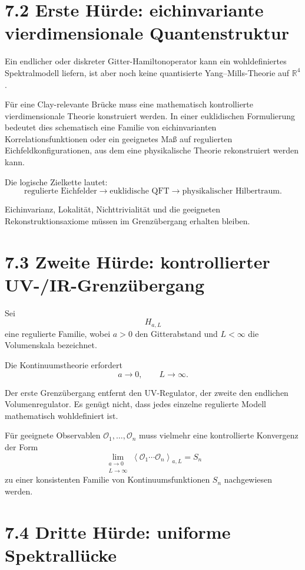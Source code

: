 \documentclass[11pt,a4paper]{article}
\begin{document}
\section*{7.2 Erste Hürde: eichinvariante vierdimensionale Quantenstruktur}

Ein endlicher oder diskreter Gitter-Hamiltonoperator kann ein wohldefiniertes
Spektralmodell liefern, ist aber noch keine quantisierte Yang--Mills-Theorie auf
$\mathbb R^4$.

Für eine Clay-relevante Brücke muss eine mathematisch kontrollierte
vierdimensionale Theorie konstruiert werden. In einer euklidischen Formulierung
bedeutet dies schematisch eine Familie von eichinvarianten Korrelationsfunktionen
oder ein geeignetes Maß auf regulierten Eichfeldkonfigurationen, aus dem eine
physikalische Theorie rekonstruiert werden kann.

Die logische Zielkette lautet:
\[
\boxed{
\text{regulierte Eichfelder}
\longrightarrow
\text{euklidische QFT}
\longrightarrow
\text{physikalischer Hilbertraum}.
}
\]

Eichinvarianz, Lokalität, Nichttrivialität und die geeigneten
Rekonstruktionsaxiome müssen im Grenzübergang erhalten bleiben.

\section*{7.3 Zweite Hürde: kontrollierter UV-/IR-Grenzübergang}

Sei
\[
H_{a,L}
\]
eine regulierte Familie, wobei $a>0$ den Gitterabstand und $L<\infty$ die
Volumenskala bezeichnet.

Die Kontinuumstheorie erfordert
\[
\boxed{
a\to0,\qquad L\to\infty.
}
\]

Der erste Grenzübergang entfernt den UV-Regulator, der zweite den
endlichen Volumenregulator. Es genügt nicht, dass jedes einzelne regulierte
Modell mathematisch wohldefiniert ist.

Für geeignete Observablen $\mathcal O_1,\ldots,\mathcal O_n$ muss vielmehr eine
kontrollierte Konvergenz der Form
\[
\lim_{\substack{a\to0\\L\to\infty}}
\left\langle
\mathcal O_1\cdots\mathcal O_n
\right\rangle_{a,L}
=
S_n
\]
zu einer konsistenten Familie von Kontinuumsfunktionen $S_n$ nachgewiesen
werden.

\section*{7.4 Dritte Hürde: uniforme Spektrallücke}
\end{document}
